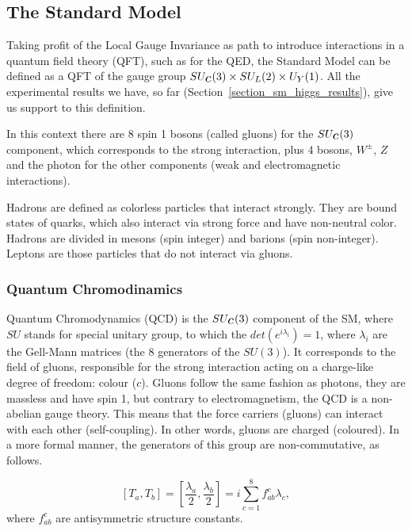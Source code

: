 \subsection{The Standard Model}

Taking profit of the Local Gauge Invariance as path to introduce interactions in a quantum field theory (QFT), such as for the QED, the Standard Model can be defined as a QFT of the gauge group $SU_{\scaleto{c}{5pt}}(3) \times SU_{\scaleto{L}{5pt}}(2) \times U_{\scaleto{Y}{5pt}}(1)$. All the experimental results we have, so far (Section~\ref{section_sm_higgs_results}), give us support to this definition. 

In this context there are 8 spin 1 bosons (called gluons) for the $SU_{\scaleto{c}{5pt}}(3)$ component, which corresponds to the strong interaction, plus 4 bosons, $W^\pm$, $Z$ and the photon for the other components (weak and electromagnetic interactions).

Hadrons are defined as colorless particles that interact strongly. They are bound states of quarks, which also interact via strong force and have non-neutral color. Hadrons are divided in mesons (spin integer) and barions (spin non-integer). Leptons are those particles that do not interact via gluons.

\subsubsection{Quantum Chromodinamics}

Quantum Chromodynamics (QCD) is the $SU_{\scaleto{c}{5pt}}(3)$ component of the SM, where $SU$ stands for special unitary group, to which the $det(e^{i\lambda_i}) = 1$, where $\lambda_i$ are the Gell-Mann matrices (the 8 generators of the $SU(3)$). It corresponds to the field of gluons, responsible for the strong interaction acting on a charge-like degree of freedom: colour ($c$). Gluons follow the same fashion as photons, they are massless and have spin 1, but contrary to electromagnetism, the QCD is a non-abelian gauge theory. This means that the force carriers (gluons) can interact with each other (self-coupling). In other words, gluons are charged (coloured). In a more formal manner, the generators of this group are non-commutative, as follows.

\begin{equation}
    \left[ T_a, T_b \right] = \left[ \frac{\lambda_a}{2}, \frac{\lambda_b}{2} \right] = i \sum_{c=1}^8 f_{ab}^c\lambda_c,
\label{photon_mass_term}
\end{equation}
where $f_{ab}^c$ are antisymmetric structure constants.


